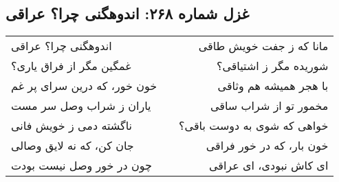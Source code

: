 \begin{center}
\section*{غزل شماره ۲۶۸: اندوهگنی چرا؟ عراقی}
\label{sec:268}
\begin{longtable}{l p{0.5cm} r}
اندوهگنی چرا؟ عراقی
&&
مانا که ز جفت خویش طاقی
\\
غمگین مگر از فراق یاری؟
&&
شوریده مگر ز اشتیاقی؟
\\
خون خور، که درین سرای پر غم
&&
با هجر همیشه هم وثاقی
\\
یاران ز شراب وصل سر مست
&&
مخمور تو از شراب ساقی
\\
ناگشته دمی ز خویش فانی
&&
خواهی که شوی به دوست باقی؟
\\
جان کن، که نه لایق وصالی
&&
خون بار، که در خور فراقی
\\
چون در خور وصل نیست بودت
&&
ای کاش نبودی، ای عراقی
\\
\end{longtable}
\end{center}
